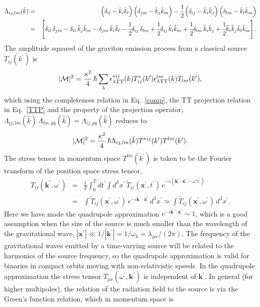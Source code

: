 \documentclass[aps,prd]{revtex4-2}
\begin{document}
\begin{eqnarray}\label{TTPk}
    \Lambda_{ij, lm}(\hat k) &=& \left(\delta_{il} - \hat{k}_{i}\hat{k}_{l}\right)\left(\delta_{jm} -\hat{k}_{j}\hat{k}_{m}\right)-\cfrac{1}{2}\left(\delta_{ij}-\hat{k}_{i}\hat{k}_{j}\right)\left(\delta_{lm}-\hat{k}_{l}\hat{k}_{m}\right)\nonumber \\
    &=&\left[\delta_{il}\,\delta_{jm} -\delta_{il}\,\hat{k}_{j}\hat{k}_{m}-\delta_{jm}\,\hat{k}_{i}\hat{k}_{l} -\cfrac{1}{2}\delta_{ij}\,\delta_{lm} +\cfrac{1}{2}\delta_{ij}\,\hat{k}_{l}\hat{k}_{m} + \cfrac{1}{2}\delta_{lm}\,\hat{k}_{i}\hat{k}_{j} + \cfrac{1}{2}\hat{k}_{i}\hat{k}_{j}\hat{k}_{l}\hat{k}_{m}\right].
\end{eqnarray}
The amplitude squared of the graviton emission process from a classical source $T_{ij}(k^\prime)$ is
\begin{eqnarray}
    |{\mathcal{M}}|^2= \frac{\kappa^2}{4}\,\hbar\sum_\lambda \epsilon_{\lambda \rm TT}^{*i j}(k) T_{i j}^*(k^\prime)\epsilon_{\lambda \rm TT}^{lm}(k) T_{lm}(k^\prime),
\end{eqnarray}
which using the completeness relation in Eq.~\eqref{comp}, the TT projection relation in Eq.~\eqref{TTP} and the property of the projection operator, $\Lambda_{ij, lm}(\hat k)\,\Lambda_{lm, pq}(\hat k)={\Lambda_{ij, pq}} (\hat k)$ reduces to
\begin{eqnarray}
    |{\cal M}|^2= \frac{\kappa^2}{4}\,\hbar {\Lambda_{ij, lm}(\hat k)} T^{*ij}(k^\prime) T^{lm}(k^\prime).
\end{eqnarray}
The stress tensor in momentum space $T^{lm}(k^\prime)$ is taken to be the Fourier transform of the position space stress tensor, 
\begin{eqnarray}
T_{ij}(\textbf{k}^\prime,\omega^\prime)&=&\frac{1}{T}\int_0^T dt^\prime \int d^3x^\prime\,\tilde{T}_{ij}(\textbf{x}^\prime,t^\prime)\,e^{-\iota(\textbf{k}^\prime\cdot \textbf{x}^\prime-\omega^\prime t^\prime)}\nonumber\\
&=& \int \tilde{T}_{ij}(\textbf{x}^\prime,\omega^{\prime})\, e^{-\iota\textbf{k}^\prime\cdot \textbf{x}^\prime}\,d^3x^\prime\simeq \int \tilde{T}_{ij}(\textbf{x}^\prime,\omega^{\prime})\,d^3x^\prime.
\label{Tij} 
\end{eqnarray}
Here we have made the quadrupole approximation $e^{-\iota\textbf{k}^\prime\cdot \textbf{x}^\prime}\sim 1$, which is a good assumption when the size of the source is much smaller than the wavelength of the gravitational wave, $|\textbf{x}^\prime|\ll 1/|\textbf{k}^\prime|= 1/\omega_k =\lambda_{gw}/(2\pi)$. The frequency of the gravitational waves emitted by a time-varying source will be related to the harmonics of the source frequency, so the quadrupole approximation is valid for binaries in compact orbits moving with non-relativistic speeds. In the quadrupole approximation the stress tensor $T_{\mu \nu}(\omega^\prime, \mathbf{k}^\prime)$ is independent of $\mathbf{k}^\prime$. In general (for higher multipoles), the relation of the radiation field to the source is via the Green's function relation, which in momentum space is
\end{document}
